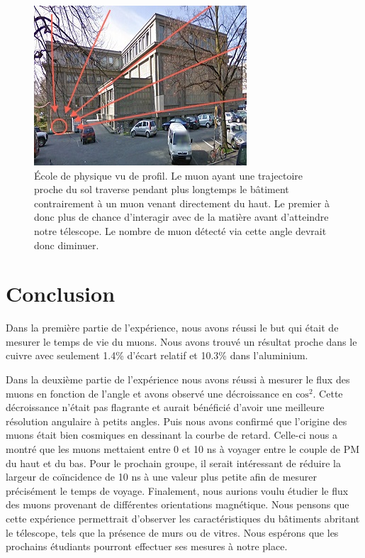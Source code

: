 \documentclass[12pt]{article}
\begin{document}
\begin{figure}[htpb!]
    \centering
    \includegraphics[width=0.6\linewidth]{graphiques/experience2/gmap_ecole_de_phys_vu_prof.jpg}
    \captionsetup{width=0.7\textwidth}
    \caption{École de physique vu de profil. Le muon ayant une trajectoire proche du sol traverse pendant plus longtemps le bâtiment contrairement à un muon venant directement du haut. Le premier à donc plus de chance d'interagir avec de la matière avant d'atteindre notre télescope. Le nombre de muon détecté via cette angle devrait donc diminuer.}
    \label{fig:ecole_phys_vue_du_prof}
\end{figure}


\section{Conclusion}

Dans la première partie de l'expérience, nous avons réussi le but qui était de mesurer le temps de vie du muons. Nous avons trouvé un résultat proche dans le cuivre avec seulement 1.4\% d'écart relatif et 10.3\% dans l'aluminium.

Dans la deuxième partie de l'expérience nous avons réussi à mesurer le flux des muons en fonction de l'angle et avons observé une décroissance en $\text{cos}^2$. Cette décroissance n'était pas flagrante et aurait bénéficié d'avoir une meilleure résolution angulaire à petits angles. Puis nous avons confirmé que l'origine des muons était bien cosmiques en dessinant la courbe de retard. Celle-ci nous a montré que les muons mettaient entre 0 et 10 ns à voyager entre le couple de PM du haut et du bas. Pour le prochain groupe, il serait intéressant de réduire la largeur de coïncidence de 10 ns à une valeur plus petite  afin de mesurer précisément le temps de voyage. Finalement, nous aurions voulu étudier le flux des muons provenant de différentes orientations magnétique. Nous pensons que cette expérience permettrait d'observer les caractéristiques du bâtiments abritant le télescope, tels que la présence de murs ou de vitres. Nous espérons que les prochains étudiants pourront effectuer ses mesures à notre place.
\end{document}
